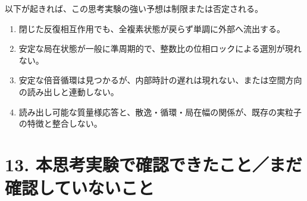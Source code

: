 \documentclass[
  a4paper,
]{ltjsarticle}
\providecommand{\tightlist}{%
  \setlength{\itemsep}{0pt}\setlength{\parskip}{0pt}}
\begin{document}
以下が起きれば、この思考実験の強い予想は制限または否定される。

\begin{enumerate}
\def\labelenumi{\arabic{enumi}.}
\tightlist
\item
  閉じた反復相互作用でも、全複素状態が戻らず単調に外部へ流出する。
\item
  安定な局在状態が一般に準周期的で、整数比の位相ロックによる選別が現れない。
\item
  安定な倍音循環は見つかるが、内部時計の遅れは現れない、または空間方向の読み出しと連動しない。
\item
  読み出し可能な質量様応答と、散逸・循環・局在幅の関係が、既存の実粒子の特徴と整合しない。
\end{enumerate}

\section{13.
本思考実験で確認できたこと／まだ確認していないこと}\label{ux672cux601dux8003ux5b9fux9a13ux3067ux78baux8a8dux3067ux304dux305fux3053ux3068ux307eux3060ux78baux8a8dux3057ux3066ux3044ux306aux3044ux3053ux3068}
\end{document}
